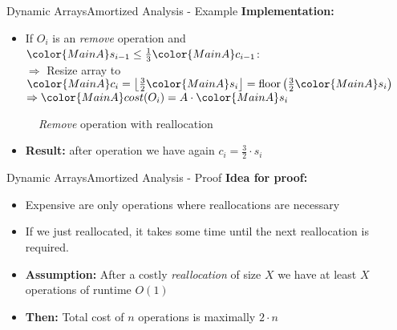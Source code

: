 \begin{frame}{Dynamic Arrays}{Amortized Analysis - Example}
  \textbf{Implementation:}
  \begin{itemize}
    \item
    If {\color{MainA}$O_i$} is an \textit{remove} operation and
    ${\color{MainA}s_{i-1}}
      \leq \frac{1}{3} {\color{MainA}c_{i-1}}$:\\
    $\Rightarrow$ Resize array to
    ${\color{MainA}c_i}
      = \left\lfloor\frac{3}{2} {\color{MainA}s_i} \right\rfloor
      = \mathrm{floor}\left(\frac{3}{2} {\color{MainA}s_i}\right)$\\
    $\Rightarrow {\color{MainA}cost(O_i)}
      = A \cdot {\color{MainA}s_i}$
  \end{itemize}
  \begin{figure}[!h]
    \def\FSAsize{15}\def\FSAelements{5}%
    \def\FSAcopy{0}\def\FSAdelete{0}\def\FSAinsert{0}%
    \def\FSAcopyarrow{0}%
    \def\FSAlabelsize{${\color{MainA}s_{i-1}} = 5$}%
    \def\FSAlabelcapacity{%
      ${\color{MainA}c_{i-1}} = 15%
      \geq {3\cdot\color{MainA}s_{i-1}}$}%
    \hspace*{0.5em}\raisebox{2em}{$\Rightarrow$}\hspace*{0.5em}%
    \def\FSAsize{6}\def\FSAelements{0}%
    \def\FSAcopy{4}\def\FSAdelete{1}\def\FSAinsert{0}%
    \def\FSAlabelsize{${\color{MainA}s_i}
      = {\color{MainA}s_{i-1}- 1} $}%
    \def\FSAlabelcapacity{$6={\color{MainA}c_i}
      = \frac{3}{2}{\color{MainA}s_i}$ = 4}%
    \caption{\textit{Remove} operation with reallocation}
    \label{fig:dynamic_fields:amortized_analysis:remove}
  \end{figure}
  \begin{itemize}
  \item[] \textbf{Result:} after operation we have again $c_i=\frac{3}{2}\cdot s_i$
  \end{itemize}
\end{frame}


\begin{frame}{Dynamic Arrays}{Amortized Analysis - Proof}
  \textbf{Idea for proof:}
  \begin{itemize}
    \item
      Expensive are only operations where reallocations are necessary
    \item
      If we just reallocated, it takes some time until the next reallocation is required.
    \item \textbf{Assumption:}
      After a costly \textit{reallocation} of size $X$ we have at least $X$ operations of runtime $O(1)$
    \item
      \textbf{Then:} Total cost of {\color{MainA}$n$} operations is maximally {\color{MainA}$2 \cdot n$}
  \end{itemize}
\end{frame}

